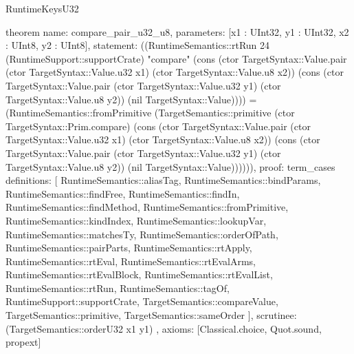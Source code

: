 \begin{lexlean}{RuntimeKeysU32}
\begin{semanticmodule}
theorem{
  name: compare_pair_u32_u8,
  parameters: [x1 : UInt32, y1 : UInt32, x2 : UInt8, y2 : UInt8],
  statement: ((RuntimeSemantics::rtRun 24 (RuntimeSupport::supportCrate) "compare" (cons (ctor TargetSyntax::Value.pair (ctor TargetSyntax::Value.u32 x1) (ctor TargetSyntax::Value.u8 x2)) (cons (ctor TargetSyntax::Value.pair (ctor TargetSyntax::Value.u32 y1) (ctor TargetSyntax::Value.u8 y2)) (nil TargetSyntax::Value)))) = (RuntimeSemantics::fromPrimitive (TargetSemantics::primitive (ctor TargetSyntax::Prim.compare) (cons (ctor TargetSyntax::Value.pair (ctor TargetSyntax::Value.u32 x1) (ctor TargetSyntax::Value.u8 x2)) (cons (ctor TargetSyntax::Value.pair (ctor TargetSyntax::Value.u32 y1) (ctor TargetSyntax::Value.u8 y2)) (nil TargetSyntax::Value)))))),
  proof: term_cases{
    definitions: [
      RuntimeSemantics::aliasTag,
      RuntimeSemantics::bindParams,
      RuntimeSemantics::findFree,
      RuntimeSemantics::findIn,
      RuntimeSemantics::findMethod,
      RuntimeSemantics::fromPrimitive,
      RuntimeSemantics::kindIndex,
      RuntimeSemantics::lookupVar,
      RuntimeSemantics::matchesTy,
      RuntimeSemantics::orderOfPath,
      RuntimeSemantics::pairParts,
      RuntimeSemantics::rtApply,
      RuntimeSemantics::rtEval,
      RuntimeSemantics::rtEvalArms,
      RuntimeSemantics::rtEvalBlock,
      RuntimeSemantics::rtEvalList,
      RuntimeSemantics::rtRun,
      RuntimeSemantics::tagOf,
      RuntimeSupport::supportCrate,
      TargetSemantics::compareValue,
      TargetSemantics::primitive,
      TargetSemantics::sameOrder
    ],
    scrutinee: (TargetSemantics::orderU32 x1 y1)
  },
  axioms: [Classical.choice, Quot.sound, propext]
}


\end{semanticmodule}
\end{lexlean}
